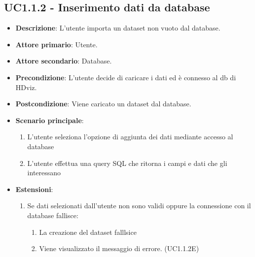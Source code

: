 \subsection{UC1.1.2 - Inserimento dati da database}
\begin{itemize}
    \item \textbf{Descrizione}: L'utente importa un dataset non vuoto dal database.

    \item \textbf{Attore primario}: Utente.
    
    \item \textbf{Attore secondario}: Database.
    
    \item \textbf{Precondizione}:   L'utente decide di caricare i dati ed è connesso al db di HDviz.

    \item \textbf{Postcondizione}:  Viene caricato un dataset dal database.

	\item \textbf{Scenario principale}:
		\begin{enumerate}
			\item L'utente seleziona l'opzione di aggiunta dei dati mediante accesso al database
			\item L'utente effettua una query SQL che ritorna i campi e dati che gli interessano
        \end{enumerate}

    \item \textbf{Estensioni}:
        \begin{enumerate}   
            \item Se dati selezionati dall'utente non sono validi oppure la connessione con il database fallisce:
            \begin{enumerate}
                \item La creazione del dataset falllsice
                \item Viene visualizzato il messaggio di errore. (UC1.1.2E)
            \end{enumerate}
         \end{enumerate}
\end{itemize}

